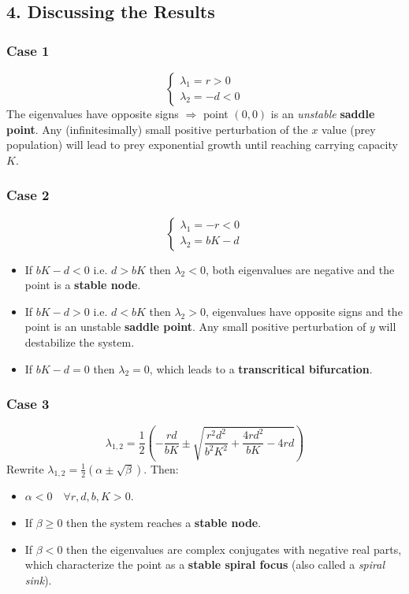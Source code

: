 \documentclass{article}
\begin{document}
	\subsection*{4. Discussing the Results}
	\subsubsection*{Case 1}
	\begin{equation}
		\begin{cases}
			\lambda_1 = r > 0 \\
			\lambda_2 = -d < 0
		\end{cases}
	\end{equation}
	The eigenvalues have opposite signs $\Rightarrow$ point $(0, 0)$ is an \emph{unstable} \textbf{saddle point}. Any (infinitesimally) small positive perturbation of the $x$ value (prey population) will lead to prey exponential growth until reaching carrying capacity $K$.
	
	\subsubsection*{Case 2}
	\begin{equation}
		\begin{cases}
			\lambda_1 = -r < 0 \\
			\lambda_2 = bK-d
		\end{cases}
	\end{equation}
	\begin{itemize}
		\item If $bK-d < 0$ i.e. $d > bK$ then $\lambda_2 < 0$, both eigenvalues are negative and the point is a \textbf{stable node}.
		\item If $bK-d > 0$ i.e. $d < bK$ then $\lambda_2 > 0$, eigenvalues have opposite signs and the point is an unstable \textbf{saddle point}. Any small positive perturbation of $y$ will destabilize the system.
		\item If $bK - d = 0$ then $\lambda_2 = 0$, which leads to a \textbf{transcritical bifurcation}.
	\end{itemize}
		
	\subsubsection*{Case 3}
	\begin{equation}
	\lambda_{1,2} = \frac{1}{2} \left(-\frac{rd}{bK} \pm \sqrt{\frac{r^2 d^2}{b^2 K^2} + \frac{4rd^2}{bK}-4rd} \right)
	\end{equation}
	Rewrite $\lambda_{1,2} = \frac{1}{2} (\alpha \pm \sqrt{\beta})$. Then:
	\begin{itemize}
		\item $\alpha < 0 \quad \forall r, d, b, K >0$. 
		\item If $\beta \ge 0$ then the system reaches a \textbf{stable node}.
		\item If $\beta < 0$ then the eigenvalues are complex conjugates with negative real parts, which characterize the point as a \textbf{stable spiral focus} (also called a \emph{spiral sink}).
	\end{itemize}
\end{document}
